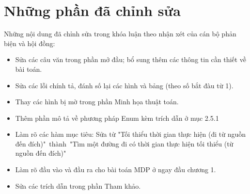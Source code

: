 \documentclass[../main.tex]{subfiles}
\begin{document}

\section*{Những phần đã chỉnh sửa}
Những nội dung đã chỉnh sửa trong khóa luận theo nhận xét của cán bộ phản biện và hội đồng:

\begin{itemize}
    \item Sửa các câu văn trong phần mở đầu; bổ sung thêm các thông tin cần thiết về bài toán.
    \item Sửa các lỗi chính tả, đánh số lại các hình và bảng (theo số bắt đàu từ 1).
    \item Thay các hình bị mờ trong phần Minh họa thuật toán.
    \item Thêm phần mô tả về phương pháp Enum kèm trích dẫn ở mục 2.5.1
    \item Làm rõ các hàm mục tiêu: Sửa từ "Tối thiểu thời gian thực hiện (đi từ nguồn đến đích)"~thành~"Tìm một đường đi có thời gian thực hiện tối thiểu (từ nguồn đến đích)"
    \item Làm rõ đầu vào và đầu ra cho bài toán MDP ở ngay đầu chương 1.
    \item Sửa các trích dẫn trong phần Tham khảo.
\end{itemize}


\backmatter
\end{document}
